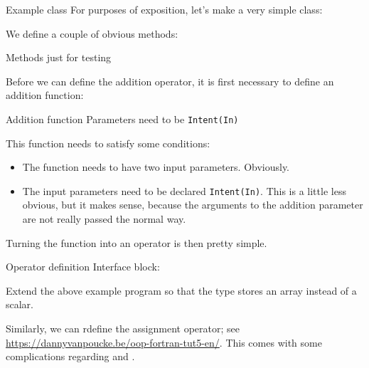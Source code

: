\begin{block}{Example class}
  \label{sl:foverload1}
  For purposes of exposition, let's make a very simple class:
\end{block}

We define a couple of obvious methods:
\begin{block}{Methods just for testing}
  \label{sl:foverload2}
  \begin{multicols}{2}
  \end{multicols}
\end{block}

Before we can define the addition operator,
it is first necessary to define an addition function:

\begin{slide}{Addition function}
  \label{sl:foverload3}
  Parameters need to be \lstinline+Intent(In)+
\end{slide}

This function needs to satisfy some conditions:
\begin{itemize}
\item The function needs to have two input parameters. Obviously.
\item The input parameters need to be declared \lstinline+Intent(In)+.
  This is a little less obvious, but it makes sense,
  because the arguments to the addition parameter are not really
  passed the normal way.
\end{itemize}

Turning the function into an operator is then pretty simple.
\begin{block}{Operator definition}
  \label{sl:field-op}
  Interface block:
\end{block}

\begin{exercise}
  \label{ex:field-op}
  Extend the above example program so that the type stores
  an array instead of a scalar.
\end{exercise}

Similarly, we can rdefine the assignment operator;
see \url{https://dannyvanpoucke.be/oop-fortran-tut5-en/}.
This comes with some complications regarding
 and .
